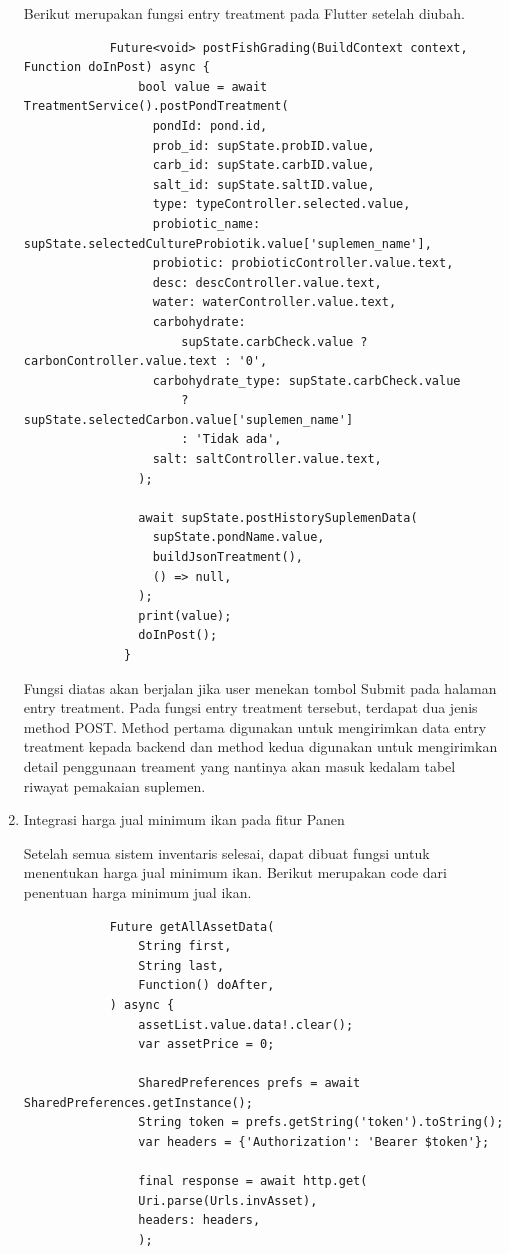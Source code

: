 \begin{spacing}{1.5}
\begin{enumerate}
		Berikut merupakan fungsi entry treatment pada Flutter setelah diubah.

		\begin{lstlisting}
			Future<void> postFishGrading(BuildContext context, Function doInPost) async {
				bool value = await TreatmentService().postPondTreatment(
				  pondId: pond.id,
				  prob_id: supState.probID.value,
				  carb_id: supState.carbID.value,
				  salt_id: supState.saltID.value,
				  type: typeController.selected.value,
				  probiotic_name: supState.selectedCultureProbiotik.value['suplemen_name'],
				  probiotic: probioticController.value.text,
				  desc: descController.value.text,
				  water: waterController.value.text,
				  carbohydrate:
					  supState.carbCheck.value ? carbonController.value.text : '0',
				  carbohydrate_type: supState.carbCheck.value
					  ? supState.selectedCarbon.value['suplemen_name']
					  : 'Tidak ada',
				  salt: saltController.value.text,
				);
			
				await supState.postHistorySuplemenData(
				  supState.pondName.value,
				  buildJsonTreatment(),
				  () => null,
				);
				print(value);
				doInPost();
			  }
		\end{lstlisting}

		Fungsi diatas akan berjalan jika user menekan tombol Submit pada halaman entry treatment. Pada fungsi entry treatment tersebut, terdapat dua jenis method POST. Method pertama digunakan untuk mengirimkan data entry treatment kepada backend dan method kedua digunakan untuk mengirimkan detail penggunaan treament yang nantinya akan masuk kedalam tabel riwayat pemakaian suplemen.

		\item Integrasi harga jual minimum ikan pada fitur Panen
		
		Setelah semua sistem inventaris selesai, dapat dibuat fungsi untuk menentukan harga jual minimum ikan. Berikut merupakan code dari penentuan harga minimum jual ikan.

		\begin{lstlisting}
			Future getAllAssetData(
				String first,
				String last,
				Function() doAfter,
			) async {
				assetList.value.data!.clear();
				var assetPrice = 0;

				SharedPreferences prefs = await SharedPreferences.getInstance();
				String token = prefs.getString('token').toString();
				var headers = {'Authorization': 'Bearer $token'};

				final response = await http.get(
				Uri.parse(Urls.invAsset),
				headers: headers,
				);


\end{lstlisting}
\end{enumerate}
\end{spacing}
